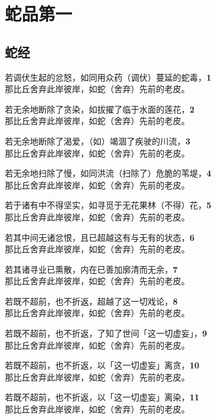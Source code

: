\chapter{蛇品第一}

\section{蛇经}

若调伏生起的忿怒，如同用众药（调伏）蔓延的蛇毒，\hfill{\grayfootnotesize \textbf{1}} \\
那比丘舍弃此岸彼岸，如蛇（舍弃）先前的老皮。


若无余地断除了贪染，如拔擢了临于水面的莲花，\hfill{\grayfootnotesize \textbf{2}} \\
那比丘舍弃此岸彼岸，如蛇（舍弃）先前的老皮。


若无余地断除了渴爱，（如）竭涸了疾驶的川流，\hfill{\grayfootnotesize \textbf{3}} \\
那比丘舍弃此岸彼岸，如蛇（舍弃）先前的老皮。


若无余地扫除了慢，如同洪流（扫除了）危脆的苇堤，\hfill{\grayfootnotesize \textbf{4}} \\
那比丘舍弃此岸彼岸，如蛇（舍弃）先前的老皮。


若于诸有中不得坚实，如寻觅于无花果林（不得）花，\hfill{\grayfootnotesize \textbf{5}} \\
那比丘舍弃此岸彼岸，如蛇（舍弃）先前的老皮。


若其中间无诸忿恨，且已超越这有与无有的状态，\hfill{\grayfootnotesize \textbf{6}} \\
那比丘舍弃此岸彼岸，如蛇（舍弃）先前的老皮。


若其诸寻业已熏散，内在已善加廓清而无余，\hfill{\grayfootnotesize \textbf{7}} \\
那比丘舍弃此岸彼岸，如蛇（舍弃）先前的老皮。


若既不超前，也不折返，超越了这一切戏论，\hfill{\grayfootnotesize \textbf{8}} \\
那比丘舍弃此岸彼岸，如蛇（舍弃）先前的老皮。


若既不超前，也不折返，了知了世间「这一切虚妄」，\hfill{\grayfootnotesize \textbf{9}} \\
那比丘舍弃此岸彼岸，如蛇（舍弃）先前的老皮。


若既不超前，也不折返，以「这一切虚妄」离贪，\hfill{\grayfootnotesize \textbf{10}} \\
那比丘舍弃此岸彼岸，如蛇（舍弃）先前的老皮。


若既不超前，也不折返，以「这一切虚妄」离染，\hfill{\grayfootnotesize \textbf{11}} \\
那比丘舍弃此岸彼岸，如蛇（舍弃）先前的老皮。

